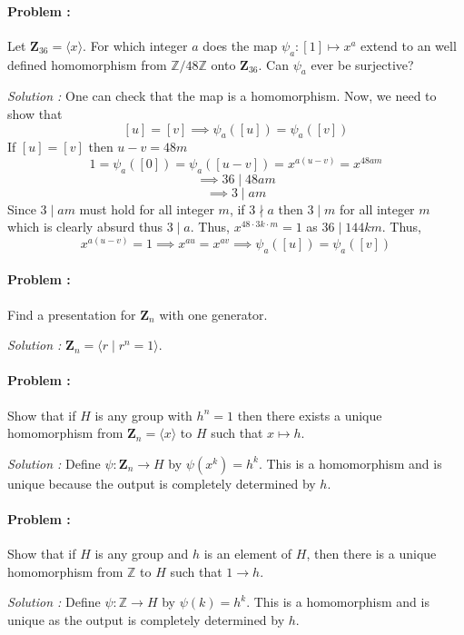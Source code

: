 \paragraph{Problem :} Let $\mathbf{Z}_{36}=\langle x \rangle$. For which integer $a$ does the map $\psi_a : [1] \mapsto x^a$ extend to an
well defined homomorphism from $\mathbb{Z}/48\mathbb{Z}$ onto $\mathbf{Z}_{36}$. Can $\psi_a$ ever be surjective?

\vspace{4mm}
\textit{Solution :}  One can check that the map is a homomorphism.  Now, we need to show that 
\[ [u]=[v] \implies \psi_a([u])=\psi_a([v]) \]
If $[u]=[v]$ then $u-v = 48 m$ 
\[ 1=\psi_a([0])=\psi_a([u-v])=x^{a(u-v)} = x^{48am} \]
\[ \implies 36 \mid 48 am \]
\[ \implies 3 \mid am \]
Since $3 \mid am$ must hold for all integer $m$, if $3 \nmid a$ then $3 \mid m$ for all integer $m$ which is clearly absurd thus $3 \mid a$.
Thus, $x^{48 \cdot 3k \cdot m} = 1 $ as $36 \mid 144km$. Thus,
\[ x^{a(u-v)}=1  \implies x^{au}=x^{av} \implies \psi_a([u])=\psi_a([v])\]

\paragraph{Problem :} Find a presentation for $\mathbf{Z}_n$ with one generator.

\vspace{4mm}
\textit{Solution :} $\mathbf{Z}_{n}=\langle r \mid r^n = 1 \rangle$.

\paragraph{Problem :} Show that if $H$ is any group with $h^n=1$ then there exists a unique homomorphism from 
$\mathbf{Z}_n=\langle x \rangle$ to $H$ such that $x \mapsto h$.

\vspace{4mm}
\textit{Solution :} Define $\psi : \mathbf{Z}_n \to H$ by $\psi(x^k)=h^k$. This is a homomorphism and is unique because the output is 
completely determined by $h$. 

\paragraph{Problem :} Show that if $H$ is any group and $h$ is an element of $H$, then there is a unique homomorphism from $\mathbb{Z}$ 
to $H$ such that $1 \to h$.

\vspace{4mm}
\textit{Solution :} Define $\psi : \mathbb{Z} \to H$ by $\psi(k)=h^k$. This is a homomorphism and is unique as the output is completely 
determined by $h$.

